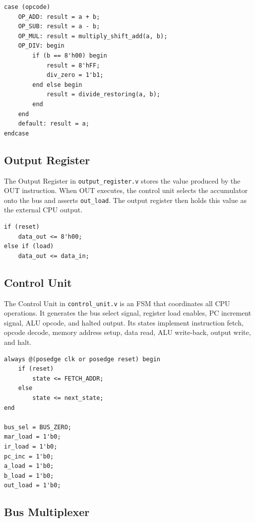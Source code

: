 \documentclass[12pt,a4paper]{article}
\begin{document}
\begin{lstlisting}[style=verilogstyle,caption={ALU operation selection}]
case (opcode)
    OP_ADD: result = a + b;
    OP_SUB: result = a - b;
    OP_MUL: result = multiply_shift_add(a, b);
    OP_DIV: begin
        if (b == 8'h00) begin
            result = 8'hFF;
            div_zero = 1'b1;
        end else begin
            result = divide_restoring(a, b);
        end
    end
    default: result = a;
endcase
\end{lstlisting}

\subsection{Output Register}

The Output Register in \texttt{output\_register.v} stores the value produced by the OUT instruction. When OUT executes, the control unit selects the accumulator onto the bus and asserts \texttt{out\_load}. The output register then holds this value as the external CPU output.

\begin{lstlisting}[style=verilogstyle,caption={Output Register load logic}]
if (reset)
    data_out <= 8'h00;
else if (load)
    data_out <= data_in;
\end{lstlisting}

\subsection{Control Unit}

The Control Unit in \texttt{control\_unit.v} is an FSM that coordinates all CPU operations. It generates the bus select signal, register load enables, PC increment signal, ALU opcode, and halted output. Its states implement instruction fetch, opcode decode, memory address setup, data read, ALU write-back, output write, and halt.

\begin{lstlisting}[style=verilogstyle,caption={Control Unit state register and default controls}]
always @(posedge clk or posedge reset) begin
    if (reset)
        state <= FETCH_ADDR;
    else
        state <= next_state;
end

bus_sel = BUS_ZERO;
mar_load = 1'b0;
ir_load = 1'b0;
pc_inc = 1'b0;
a_load = 1'b0;
b_load = 1'b0;
out_load = 1'b0;
\end{lstlisting}

\subsection{Bus Multiplexer}
\end{document}
